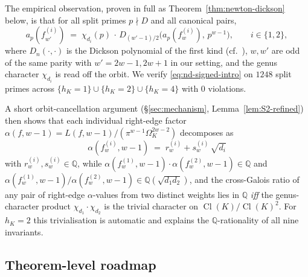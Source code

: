 \documentclass[11pt,a4paper]{amsart}
\theoremstyle{plain}
\theoremstyle{definition}
\DeclareMathOperator{\Cl}{Cl}
\newcommand{\Q}{\mathbb{Q}}
\newcommand{\fl}[2]{f_{#1}^{(#2)}}
\begin{document}
The empirical observation, proven in full as Theorem~\ref{thm:newton-dickson}
below, is that for all split primes $p \nmid D$ and all canonical pairs,
\begin{equation}\label{eq:nd-signed-intro}
   a_p(\fl{w'}{i}) \;=\; \chi_{d_i}(p)\,\cdot\,
     D_{(w'-1)/2}\!\bigl(a_p(\fl{w}{i}),\,p^{w-1}\bigr),
\qquad i \in \{1, 2\},
\end{equation}
where $D_n(\cdot, \cdot)$ is the Dickson polynomial of the first kind (cf.\
\cite{Lidl1993}), $w, w'$ are odd of the same parity with $w' = 2w-1, 2w+1$
in our setting, and the genus character $\chi_{d_i}$ is read off the orbit.
We verify \eqref{eq:nd-signed-intro} on $1248$ split primes across
$\{h_K = 1\}\cup\{h_K = 2\}\cup\{h_K = 4\}$ with $0$ violations.

A short orbit-cancellation argument
(\S\ref{sec:mechanism}, Lemma~\ref{lem:S2-refined}) then
shows that each individual right-edge factor $\alpha(f, w-1)
= L(f, w-1)/(\pi^{w-1}\Omega_K^{2w-2})$ decomposes as
\[
   \alpha(f_w^{(i)}, w-1) \;=\; r_w^{(i)} + s_w^{(i)}\,\sqrt{d_i}
\]
with $r_w^{(i)}, s_w^{(i)}\in\Q$, while
$\alpha(f_w^{(1)}, w-1)\cdot \alpha(f_w^{(2)}, w-1) \in \Q$ and
$\alpha(f_w^{(1)}, w-1)/\alpha(f_w^{(2)}, w-1)\in\Q(\sqrt{d_1 d_2})$, and
the cross-Galois ratio of any pair of right-edge $\alpha$-values from two
distinct weights lies in $\Q$ \emph{iff} the genus-character product
$\chi_{d_1}\cdot\chi_{d_2}$ is the trivial character on $\Cl(K)/\Cl(K)^2$.
For $h_K = 2$ this trivialisation is automatic and explains the
$\Q$-rationality of all nine invariants.

\subsection{Theorem-level roadmap}
\end{document}
